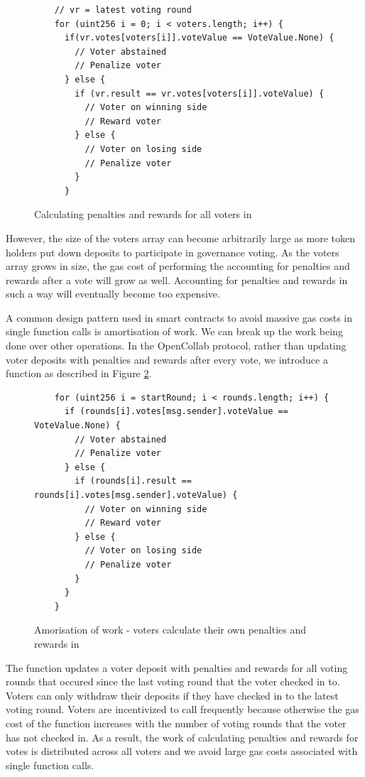 \begin{figure}[]
  \centering
  \begin{lstlisting}
    // vr = latest voting round
    for (uint256 i = 0; i < voters.length; i++) {
      if(vr.votes[voters[i]].voteValue == VoteValue.None) {
        // Voter abstained
        // Penalize voter
      } else {
        if (vr.result == vr.votes[voters[i]].voteValue) {
          // Voter on winning side
          // Reward voter
        } else {
          // Voter on losing side
          // Penalize voter
        }
      }
  \end{lstlisting}
  \caption{Calculating penalties and rewards for all voters in }
  \label{fig:allVoters}
\end{figure}

However, the size of the voters array can become arbitrarily large as more token
holders put down deposits to participate in governance voting. As the voters
array grows in size, the gas cost of performing the accounting for penalties and
rewards after a vote will grow as well. Accounting for penalties and rewards in
such a way will eventually become too expensive.

A common design pattern used in smart contracts to avoid massive gas costs in
single function calls is amortisation of work\cite{amortisationWork}. We can
break up the work being done over other operations. In the OpenCollab protocol,
rather than updating voter deposits with penalties and rewards after every vote,
we introduce a  function as described in Figure
\ref{fig:voterCheckIn}.

\begin{figure}[]
  \centering
  \begin{lstlisting}
    for (uint256 i = startRound; i < rounds.length; i++) {
      if (rounds[i].votes[msg.sender].voteValue == VoteValue.None) {
        // Voter abstained
        // Penalize voter
      } else {
        if (rounds[i].result == rounds[i].votes[msg.sender].voteValue) {
          // Voter on winning side
          // Reward voter
        } else {
          // Voter on losing side
          // Penalize voter
        }
      }
    }
  \end{lstlisting}
  \caption{Amorisation of work - voters calculate their own penalties and
    rewards in }
  \label{fig:voterCheckIn}
\end{figure}

The function updates a voter deposit with penalties and rewards for all voting rounds that occured since the
last voting round that the voter checked in to. Voters can only withdraw their deposits if they have checked in to the latest voting round. Voters are
incentivized to call  frequently because otherwise the
gas cost of the function increases with the number of voting rounds that the
voter has not checked in. As a result, the work of calculating penalties and rewards for votes is distributed across
all voters and we avoid large gas costs associated with single function calls.

